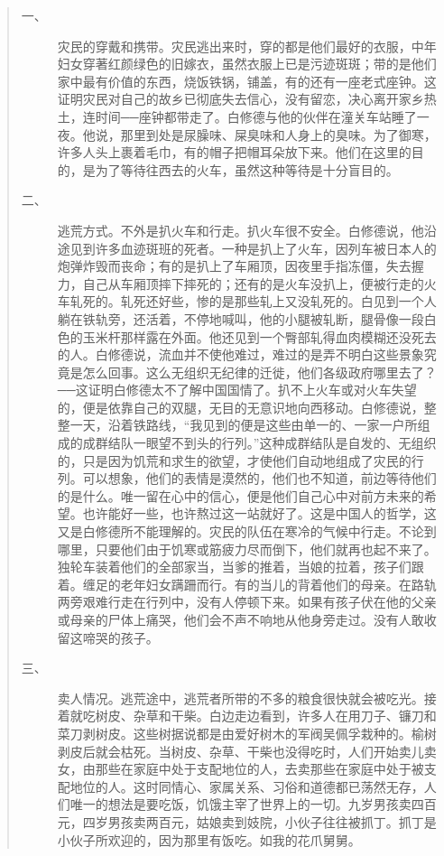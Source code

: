 \begin{quote}
	\begin{description}
		\item [一、] 灾民的穿戴和携带。灾民逃出来时，穿的都是他们最好的衣服，中年妇女穿著红颜绿色的旧嫁衣，虽然衣服上已是污迹斑斑；带的是他们家中最有价值的东西，烧饭铁锅，铺盖，有的还有一座老式座钟。这证明灾民对自己的故乡已彻底失去信心，没有留恋，决心离开家乡热土，连时间{\Add ──}座钟都带走了。白修德与他的伙伴在潼关车站睡了一夜。他说，那里到处是尿臊味、屎臭味和人身上的臭味。为了御寒，许多人头上裹着毛巾，有的帽子把帽耳朵放下来。他们在这里的目的，是为了等待往西去的火车，虽然这种等待是十分盲目的。\\
		
		\item [二、] 逃荒方式。不外是扒火车和行走。扒火车很不安全。白修德说，他沿途见到许多血迹斑班的死者。一种是扒上了火车，因列车被日本人的炮弹炸毁而丧命；有的是扒上了车厢顶，因夜里手指冻僵，失去握力，自己从车厢顶摔下摔死的；还有的是火车没扒上，便被行走的火车轧死的。轧死还好些，惨的是那些轧上又没轧死的。白见到一个人躺在铁轨旁，还活着，不停地喊叫，他的小腿被轧断，腿骨像一段白色的玉米杆那样露在外面。他还见到一个臀部轧得血肉模糊还没死去的人。白修德说，流血并不使他难过，难过的是弄不明白这些景象究竟是怎么回事。这么无组织无纪律的迁徙，他们各级政府哪里去了？{\Add ──}这证明白修德太不了解中国国情了。扒不上火车或对火车失望的，便是依靠自己的双腿，无目的无意识地向西移动。白修德说，整整一天，沿着铁路线，“我见到的便是这些由单一的、一家一户所组成的成群结队一眼望不到头的行列。”这种成群结队是自发的、无组织的，只是因为饥荒和求生的欲望，才使他们自动地组成了灾民的行列。可以想象，他们的表情是漠然的，他们也不知道，前边等待他们的是什么。唯一留在心中的信心，便是他们自己心中对前方未来的希望。也许能好一些，也许熬过这一站就好了。这是中国人的哲学，这又是白修德所不能理解的。灾民的队伍在寒冷的气候中行走。不论到哪里，只要他们由于饥寒或筋疲力尽而倒下，他们就再也起不来了。独轮车装着他们的全部家当，当爹的推着，当娘的拉着，孩子们跟着。缠足的老年妇女蹒跚而行。有的当儿的背着他们的母亲。在路轨两旁艰难行走在行列中，没有人停顿下来。如果有孩子伏在他的父亲或母亲的尸体上痛哭，他们会不声不响地从他身旁走过。没有人敢收留这啼哭的孩子。\\
		
		\item [三、] 卖人情况。逃荒途中，逃荒者所带的不多的粮食很快就会被吃光。接着就吃树皮、杂草和干柴。白边走边看到，许多人在用刀子、镰刀和菜刀剥树皮。这些树据说都是由爱好树木的军阀吴佩孚栽种的。榆树剥皮后就会枯死。当树皮、杂草、干柴也没得吃时，人们开始卖儿卖女，由那些在家庭中处于支配地位的人，去卖那些在家庭中处于被支配地位的人。这时同情心、家属关系、习俗和道德都已荡然无存，人们唯一的想法是要吃饭，饥饿主宰了世界上的一切。九岁男孩卖四百元，四岁男孩卖两百元，姑娘卖到妓院，小伙子往往被抓丁。抓丁是小伙子所欢迎的，因为那里有饭吃。如我的花爪舅舅。\\
		

\end{description}
\end{quote}
